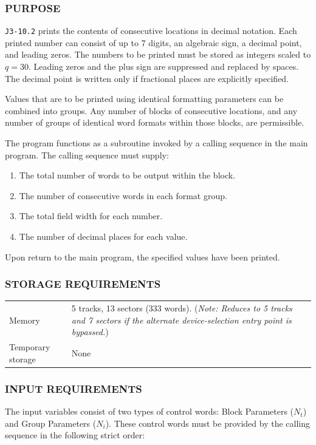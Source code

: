 \subsubsection*{PURPOSE}
\texttt{J3-10.2} prints the contents of consecutive locations in decimal notation. Each printed number can consist of up to 7 digits, an algebraic sign, a decimal point, and leading zeros. The numbers to be printed must be stored as integers scaled to $q=30$. Leading zeros and the plus sign are suppressed and replaced by spaces. The decimal point is written only if fractional places are explicitly specified. 

Values that are to be printed using identical formatting parameters can be combined into groups. Any number of blocks of consecutive locations, and any number of groups of identical word formats within those blocks, are permissible.

The program functions as a subroutine invoked by a calling sequence in the main program. The calling sequence must supply:
\begin{enumerate}
    \item The total number of words to be output within the block.
    \item The number of consecutive words in each format group.
    \item The total field width for each number.
    \item The number of decimal places for each value.
\end{enumerate}
Upon return to the main program, the specified values have been printed.

\subsubsection*{STORAGE REQUIREMENTS}
\begin{center}
\begin{tabularx}{\textwidth}{lX}
    \toprule
    Memory & 5 tracks, 13 sectors (333 words). \small(\textit{Note: Reduces to 5 tracks and 7 sectors if the alternate device-selection entry point is bypassed.}) \\
    Temporary storage    & None \\
    \bottomrule
\end{tabularx}
\end{center}

\subsubsection*{INPUT REQUIREMENTS}
The input variables consist of two types of control words: Block Parameters ($N_t$) and Group Parameters ($N_i$). These control words must be provided by the calling sequence in the following strict order:

